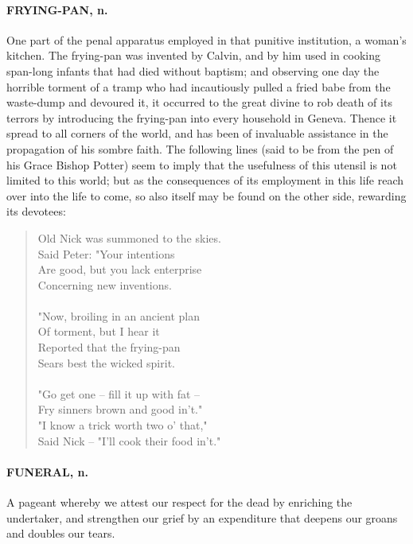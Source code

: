 \documentclass[11pt]{article}
\begin{document}
\paragraph{FRYING-PAN, n.}  One part of the penal apparatus employed in that
punitive institution, a woman's kitchen.  The frying-pan was invented
by Calvin, and by him used in cooking span-long infants that had died
without baptism; and observing one day the horrible torment of a tramp
who had incautiously pulled a fried babe from the waste-dump and
devoured it, it occurred to the great divine to rob death of its
terrors by introducing the frying-pan into every household in Geneva.
Thence it spread to all corners of the world, and has been of
invaluable assistance in the propagation of his sombre faith.  The
following lines (said to be from the pen of his Grace Bishop Potter)
seem to imply that the usefulness of this utensil is not limited to
this world; but as the consequences of its employment in this life
reach over into the life to come, so also itself may be found on the
other side, rewarding its devotees:

\begin{quote}   Old Nick was summoned to the skies. \\
      Said Peter:  "Your intentions \\
  Are good, but you lack enterprise \\
      Concerning new inventions. \\
 \\
  "Now, broiling in an ancient plan \\
      Of torment, but I hear it \\
  Reported that the frying-pan \\
      Sears best the wicked spirit. \\
 \\
  "Go get one -- fill it up with fat -- \\
      Fry sinners brown and good in't." \\
  "I know a trick worth two o' that," \\
      Said Nick -- "I'll cook their food in't."  \end{quote}

\paragraph{FUNERAL, n.}  A pageant whereby we attest our respect for the dead by
enriching the undertaker, and strengthen our grief by an expenditure
that deepens our groans and doubles our tears.
\end{document}
